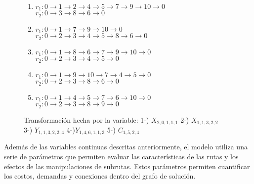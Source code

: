 \documentclass{article}
\begin{document}
\begin{figure}[h!]
    \vspace{0.5em}
\begin{enumerate}
\item
$r_1:  0 \rightarrow 1\rightarrow 2\rightarrow 4 \rightarrow 5 \rightarrow 7 \rightarrow 9 \rightarrow 10 \rightarrow 0$\\
$r_2:  0\rightarrow 3\rightarrow 8 \rightarrow 6 \rightarrow 0$\\
\item
$r_1:  0 \rightarrow 1 \rightarrow 7 \rightarrow 9 \rightarrow 10 \rightarrow 0$\\
$r_2:  0\rightarrow 2\rightarrow 3 \rightarrow 4 \rightarrow 5\rightarrow 8 \rightarrow 6 \rightarrow 0$\\
\item
$r_1:  0 \rightarrow 1\rightarrow  8 \rightarrow 6 \rightarrow 7 \rightarrow 9 \rightarrow 10 \rightarrow  0$\\
$r_2:  0\rightarrow 2\rightarrow 3\rightarrow 4 \rightarrow 5 \rightarrow  0$\\
\item 
$r_1:  0 \rightarrow 1\rightarrow 9 \rightarrow 10 \rightarrow 7 \rightarrow 4 \rightarrow 5 \rightarrow  0$\\
$r_2:  0\rightarrow 2\rightarrow 3\rightarrow 8 \rightarrow 6 \rightarrow  0$\\
\item
$r_1:  0 \rightarrow 1\rightarrow 4 \rightarrow 5 \rightarrow 7 \rightarrow 6 \rightarrow 10 \rightarrow  0$\\
$r_2:  0\rightarrow 2\rightarrow 3\rightarrow 8 \rightarrow 9 \rightarrow  0$\\
\end{enumerate}
\caption{Transformación hecha por la variable: 1-) $X_{2,0,1,1,1}$ 2-) $X_{1,1,3,2,2}$ \\3-) $Y_{1,1,3,2,2,4}$ 4-)$Y_{1,4,6,1,1,3}$  5-) $C_{1,5,2,4}$}
\label{fig:transformation}
\end{figure}










Además de las variables continuas descritas anteriormente, el modelo utiliza una serie de parámetros que permiten evaluar las características de las rutas y los efectos de las manipulaciones de subrutas. Estos parámetros permiten cuantificar los costos, demandas y conexiones dentro del grafo de solución. 
\end{document}

